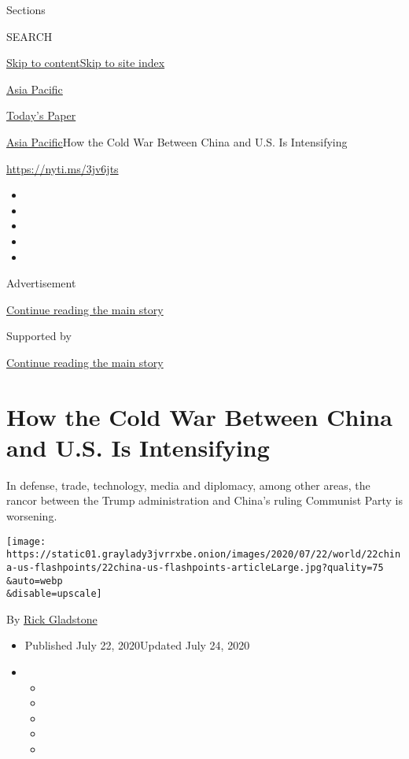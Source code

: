 Sections

SEARCH

\protect\hyperlink{site-content}{Skip to
content}\protect\hyperlink{site-index}{Skip to site index}

\href{https://www.nytimes3xbfgragh.onion/section/world/asia}{Asia
Pacific}

\href{https://myaccount.nytimes3xbfgragh.onion/auth/login?response_type=cookie\&client_id=vi}{}

\href{https://www.nytimes3xbfgragh.onion/section/todayspaper}{Today's
Paper}

\href{/section/world/asia}{Asia Pacific}\textbar{}How the Cold War
Between China and U.S. Is Intensifying

\url{https://nyti.ms/3jv6jts}

\begin{itemize}
\item
\item
\item
\item
\item
\end{itemize}

Advertisement

\protect\hyperlink{after-top}{Continue reading the main story}

Supported by

\protect\hyperlink{after-sponsor}{Continue reading the main story}

\hypertarget{how-the-cold-war-between-china-and-us-is-intensifying}{%
\section{How the Cold War Between China and U.S. Is
Intensifying}\label{how-the-cold-war-between-china-and-us-is-intensifying}}

In defense, trade, technology, media and diplomacy, among other areas,
the rancor between the Trump administration and China's ruling Communist
Party is worsening.

\texttt{[image: https://static01.graylady3jvrrxbe.onion/images/2020/07/22/world/22china-us-flashpoints/22china-us-flashpoints-articleLarge.jpg?quality=75\\\&auto=webp\\\&disable=upscale]}

By \href{https://www.nytimes3xbfgragh.onion/by/rick-gladstone}{Rick
Gladstone}

\begin{itemize}
\item
  Published July 22, 2020Updated July 24, 2020
\item
  \begin{itemize}
  \item
  \item
  \item
  \item
  \item
  \end{itemize}
\end{itemize}

